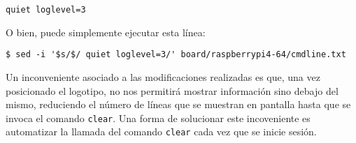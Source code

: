 \begin{Verbatim}[gobble=1]
	quiet loglevel=3
\end{Verbatim}

O bien, puede simplemente ejecutar esta línea:

\begin{Verbatim}[gobble=1]
	$ sed -i '$s/$/ quiet loglevel=3/' board/raspberrypi4-64/cmdline.txt
\end{Verbatim}

Un inconveniente asociado a las modificaciones realizadas es que, una vez posicionado el logotipo, no nos permitirá mostrar información sino debajo del mismo, reduciendo el número de líneas que se muestran en pantalla hasta que se invoca el comando \texttt{clear}.
Una forma de solucionar este incoveniente es automatizar la llamada del comando \texttt{clear} cada vez que se inicie sesión.
